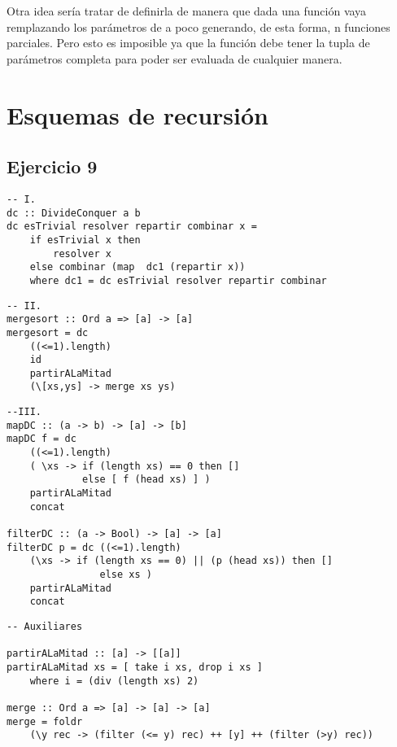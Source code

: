 \documentclass[10pt,a4paper]{article}
\begin{document}
Otra idea sería tratar de definirla de manera que dada una función vaya remplazando los parámetros de a poco generando, de esta forma, n funciones parciales. Pero esto es imposible ya que la función debe tener la tupla de parámetros completa para poder ser evaluada de cualquier manera.

\section*{Esquemas de recursión}
\subsection{Ejercicio 9}
\begin{centrado}
	\begin{verbatim}
-- I.
dc :: DivideConquer a b
dc esTrivial resolver repartir combinar x = 
	if esTrivial x then 
		resolver x 
	else combinar (map  dc1 (repartir x))
	where dc1 = dc esTrivial resolver repartir combinar

\end{verbatim}
\end{centrado}

\begin{centrado}
	\begin{verbatim}
-- II.
mergesort :: Ord a => [a] -> [a]
mergesort = dc
    ((<=1).length)
    id
    partirALaMitad
    (\[xs,ys] -> merge xs ys)	
	\end{verbatim}
\end{centrado}

\begin{centrado}
	\begin{verbatim}
--III.    
mapDC :: (a -> b) -> [a] -> [b]
mapDC f = dc 
    ((<=1).length)
    ( \xs -> if (length xs) == 0 then [] 
	         else [ f (head xs) ] )
    partirALaMitad
    concat

filterDC :: (a -> Bool) -> [a] -> [a]
filterDC p = dc ((<=1).length)
	(\xs -> if (length xs == 0) || (p (head xs)) then []
		        else xs )
	partirALaMitad
	concat
	\end{verbatim}
\end{centrado}

\begin{centrado}
	\begin{verbatim}
-- Auxiliares

partirALaMitad :: [a] -> [[a]]
partirALaMitad xs = [ take i xs, drop i xs ] 
	where i = (div (length xs) 2)

merge :: Ord a => [a] -> [a] -> [a]
merge = foldr 
	(\y rec -> (filter (<= y) rec) ++ [y] ++ (filter (>y) rec))	 
	\end{verbatim}
\end{centrado}
\end{document}
